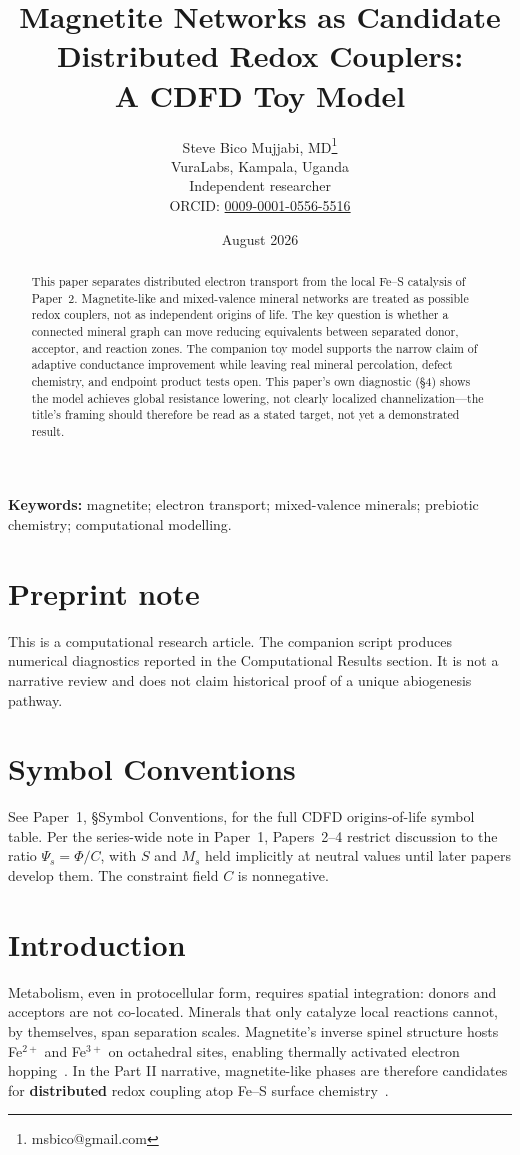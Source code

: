 \documentclass[11pt,a4paper]{article}
\title{Magnetite Networks as Candidate Distributed Redox Couplers:\\ A CDFD Toy Model}
\author{Steve Bico Mujjabi, MD\thanks{msbico@gmail.com}\\
VuraLabs, Kampala, Uganda\\
Independent researcher\\
ORCID: \href{https://orcid.org/0009-0001-0556-5516}{0009-0001-0556-5516}}
\date{August 2026}
\begin{document}
\maketitle

\begin{abstract}
This paper separates distributed electron transport from the local Fe--S catalysis of Paper~2. Magnetite-like and mixed-valence mineral networks are treated as possible redox couplers, not as independent origins of life. The key question is whether a connected mineral graph can move reducing equivalents between separated donor, acceptor, and reaction zones. The companion toy model supports the narrow claim of adaptive conductance improvement while leaving real mineral percolation, defect chemistry, and endpoint product tests open. This paper's own diagnostic (\S4) shows the model achieves global resistance lowering, not clearly localized channelization---the title's framing should therefore be read as a stated target, not yet a demonstrated result.
\end{abstract}

\noindent\textbf{Keywords:} magnetite; electron transport; mixed-valence minerals; prebiotic chemistry; computational modelling.

\section*{Preprint note}
This is a computational research article. The companion script produces numerical diagnostics reported in the Computational Results section. It is not a narrative review and does not claim historical proof of a unique abiogenesis pathway.

\section*{Symbol Conventions}
See Paper~1, \S Symbol Conventions, for the full CDFD origins-of-life symbol table. Per the series-wide note in Paper~1, Papers~2--4 restrict discussion to the ratio $\Psi_s=\Phi/C$, with $S$ and $M_s$ held implicitly at neutral values until later papers develop them. The constraint field $C$ is nonnegative.

\section{Introduction}
Metabolism, even in protocellular form, requires spatial integration: donors and acceptors are not co-located. Minerals that only catalyze local reactions cannot, by themselves, span separation scales. Magnetite's inverse spinel structure hosts Fe$^{2+}$ and Fe$^{3+}$ on octahedral sites, enabling thermally activated electron hopping~\cite{Skomurski2010}. In the Part II narrative, magnetite-like phases are therefore candidates for \textbf{distributed} redox coupling atop Fe--S surface chemistry~\cite{Martin2007,Russell1994}.
\end{document}
